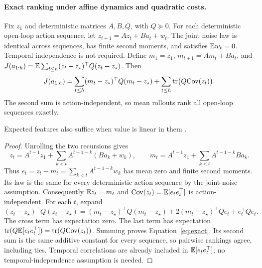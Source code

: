 \paragraph{Exact ranking under affine dynamics and quadratic costs.}
\begin{proposition}
\label{prop:exact}
Fix $z_1$ and deterministic matrices $A,B,Q$, with $Q\succeq0$.
For each deterministic open-loop action sequence, let $z_{t+1}=Az_t+Ba_t+w_t$.
The joint noise law is identical across sequences, has finite second moments, and satisfies $\mathbb{E} w_t=0$.
Temporal independence is not required.
Define $m_1=z_1$, $m_{t+1}=Am_t+Ba_t$, and $J(a_{1:h})=\mathbb{E}\sum_{t\le h}(z_t-z_\star)^\top Q(z_t-z_\star)$.
Then
\begin{equation}
\label{eq:exact}
J(a_{1:h})=\sum_{t\le h}(m_t-z_\star)^\top Q(m_t-z_\star)
+\sum_{t\le h}\mathrm{tr}\big(Q\mathrm{Cov}(z_t)\big).
\end{equation}
The second sum is action-independent, so mean rollouts rank all open-loop sequences exactly.
\end{proposition}
Expected features also suffice when value is linear in them
\citep{wan2019expectation,wan2021expectationcontrol}.
\begin{proof}
Unrolling the two recursions gives
\[
z_t=A^{t-1}z_1+\sum_{k<t}A^{t-1-k}(Ba_k+w_k),\qquad
m_t=A^{t-1}z_1+\sum_{k<t}A^{t-1-k}Ba_k.
\]
Thus $e_t=z_t-m_t=\sum_{k<t}A^{t-1-k}w_k$ has mean zero and finite second moments.
Its law is the same for every deterministic action sequence by the joint-noise assumption.
Consequently $\mathbb{E} z_t=m_t$ and $\mathrm{Cov}(z_t)=\mathbb{E}[e_te_t^\top]$ is action-independent.
For each $t$, expand
\[
(z_t-z_\star)^\top Q(z_t-z_\star)
=(m_t-z_\star)^\top Q(m_t-z_\star)
+2(m_t-z_\star)^\top Qe_t+e_t^\top Qe_t.
\]
The cross term has expectation zero.
The last term has expectation $\mathrm{tr}(Q\mathbb{E}[e_te_t^\top])=\mathrm{tr}(Q\mathrm{Cov}(z_t))$.
Summing proves Equation~\ref{eq:exact}.
Its second sum is the same additive constant for every sequence, so pairwise rankings agree, including ties.
Temporal correlations are already included in $\mathbb{E}[e_te_t^\top]$; no temporal-independence assumption is needed.
\end{proof}

